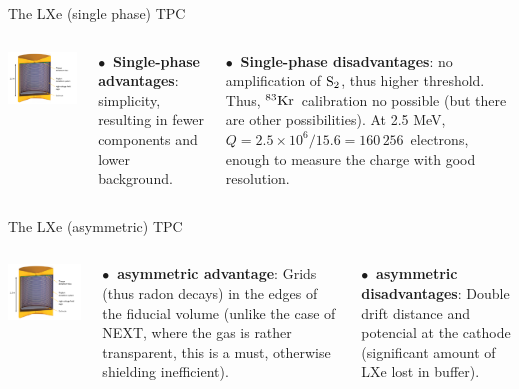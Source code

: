 \documentclass [aspectratio=169]{beamer}
\newcommand{\KR}{\ensuremath{{}^{83}{\rm Kr}}}
\newcommand{\st}{\ensuremath{\rm S_2}}
\begin{document}
\begin{frame}{The LXe (single phase) TPC}
\begin{columns}
\includegraphics[scale=0.6]{nexosketch.png}

$\bullet~$ {\bf Single-phase advantages}: simplicity, resulting in fewer components and lower background. 

$\bullet~$ {\bf Single-phase disadvantages}: no amplification of \st, thus higher threshold. Thus, \KR\ calibration no possible (but there are other possibilities). At 2.5 MeV, $Q = 2.5\times 10^6/15.6 = 160\, 256$~electrons, enough to measure the charge with good resolution.  
\end{columns}
\end{frame}

\begin{frame}{The LXe (asymmetric) TPC}
\begin{columns}
\includegraphics[scale=0.6]{nexosketch.png}

$\bullet~$ {\bf asymmetric advantage}: Grids (thus radon decays) in the edges of the fiducial volume (unlike the case of NEXT, where the gas is rather transparent, this is a must, otherwise shielding inefficient). 

$\bullet~$ {\bf asymmetric disadvantages}: Double drift distance and potencial at the cathode (significant amount of LXe lost in buffer).  
\end{columns}
\end{frame}
\end{document}

